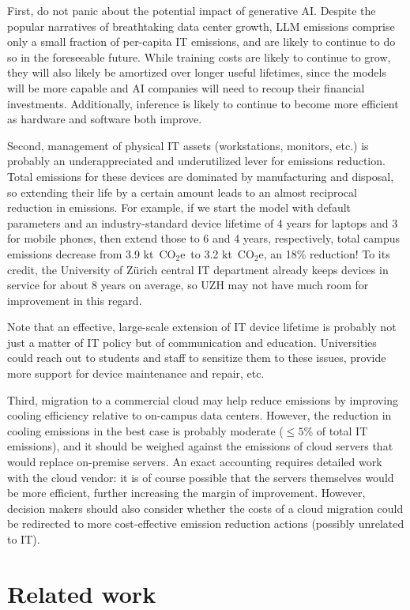 \documentclass[11pt]{article}
\newcommand{\coe}{CO$_2$e}
\newcommand{\tcoe}{t~\coe}
\begin{document}
First, do not panic about the potential impact of generative AI. Despite the popular narratives of breathtaking data center growth, LLM emissions comprise only a small fraction of per-capita IT emissions, and are likely to continue to do so in the foreseeable future. While training costs are likely to continue to grow, they will also likely be amortized over longer useful lifetimes, since the models will be more capable and AI companies will need to recoup their financial investments. Additionally, inference is likely to continue to become more efficient as hardware and software both improve.

Second, management of physical IT assets (workstations, monitors, etc.) is probably an underappreciated and underutilized lever for emissions reduction. Total emissions for these devices are dominated by manufacturing and disposal, so extending their life by a certain amount leads to an almost reciprocal reduction in emissions. For example, if we start the model with default parameters and an industry-standard device lifetime of 4 years for laptops and 3 for mobile phones, then extend those to 6 and 4 years, respectively, total campus emissions decrease from 3.9 k\tcoe\ to 3.2 k\tcoe, an 18\% reduction! To its credit, the University of Zürich central IT department already keeps devices in service for about 8 years on average, so UZH may not have much room for improvement in this regard.

Note that an effective, large-scale extension of IT device lifetime is probably not just a matter of IT policy but of communication and education. Universities could reach out to students and staff to sensitize them to these issues, provide more support for device maintenance and repair, etc.

Third, migration to a commercial cloud may help reduce emissions by improving cooling efficiency relative to on-campus data centers. However, the reduction in cooling emissions in the best case is probably moderate ($\le 5$\% of total IT emissions), and it should be weighed against the emissions of cloud servers that would replace on-premise servers. An exact accounting requires detailed work with the cloud vendor: it is of course possible that the servers themselves would be more efficient, further increasing the margin of improvement. However, decision makers should also consider whether the costs of a cloud migration could be redirected to more cost-effective emission reduction actions (possibly unrelated to IT).

\section{Related work}
\label{sec:related:work}
\end{document}
